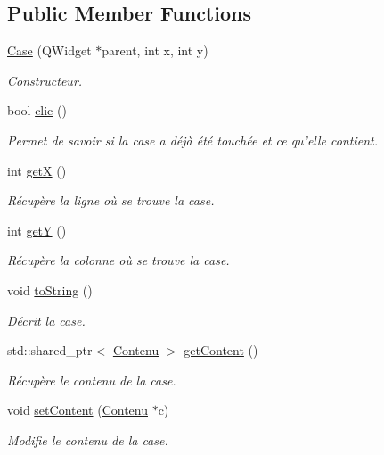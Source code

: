 \subsection*{Public Member Functions}
\begin{DoxyCompactItemize}
\item 
\hyperlink{classCase_a5fc4408a8eea8e390fd9b8d3ae6345a7}{Case} (Q\+Widget $\ast$parent, int x, int y)
\begin{DoxyCompactList}\small\item\em Constructeur. \end{DoxyCompactList}\item 
bool \hyperlink{classCase_afa446bb3223628f76144f077df5e7618}{clic} ()
\begin{DoxyCompactList}\small\item\em Permet de savoir si la case a déjà été touchée et ce qu'elle contient. \end{DoxyCompactList}\item 
int \hyperlink{classCase_ab5580b919199dd2ec379672d3390bbff}{get\+X} ()
\begin{DoxyCompactList}\small\item\em Récupère la ligne où se trouve la case. \end{DoxyCompactList}\item 
int \hyperlink{classCase_a824f612c5a660a1d55ac06931747c46d}{get\+Y} ()
\begin{DoxyCompactList}\small\item\em Récupère la colonne où se trouve la case. \end{DoxyCompactList}\item 
void \hyperlink{classCase_a77e28934961e13da9fcf0f1168b8e7a4}{to\+String} ()
\begin{DoxyCompactList}\small\item\em Décrit la case. \end{DoxyCompactList}\item 
std\+::shared\+\_\+ptr$<$ \hyperlink{classContenu}{Contenu} $>$ \hyperlink{classCase_ae761fa055a6c3e3e228d22b503b525ae}{get\+Content} ()
\begin{DoxyCompactList}\small\item\em Récupère le contenu de la case. \end{DoxyCompactList}\item 
void \hyperlink{classCase_a474429530bc089e09a51410ca92a5ad7}{set\+Content} (\hyperlink{classContenu}{Contenu} $\ast$c)
\begin{DoxyCompactList}\small\item\em Modifie le contenu de la case. \end{DoxyCompactList}\item 

\end{DoxyCompactItemize}
